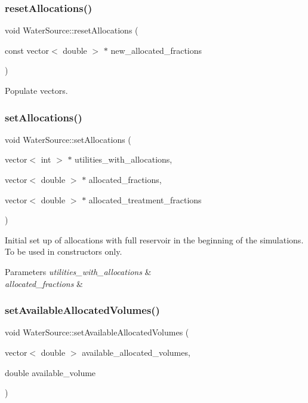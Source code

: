 \subsubsection{\texorpdfstring{reset\+Allocations()}{resetAllocations()}}
{\footnotesize\ttfamily void Water\+Source\+::reset\+Allocations (\begin{DoxyParamCaption}\item[{const vector$<$ double $>$ $\ast$}]{new\+\_\+allocated\+\_\+fractions }\end{DoxyParamCaption})}

Populate vectors. \mbox{\label{classWaterSource_ac834762e016e796968ad286feeca7be6}} 
\subsubsection{\texorpdfstring{set\+Allocations()}{setAllocations()}}
{\footnotesize\ttfamily void Water\+Source\+::set\+Allocations (\begin{DoxyParamCaption}\item[{vector$<$ int $>$ $\ast$}]{utilities\+\_\+with\+\_\+allocations,  }\item[{vector$<$ double $>$ $\ast$}]{allocated\+\_\+fractions,  }\item[{vector$<$ double $>$ $\ast$}]{allocated\+\_\+treatment\+\_\+fractions }\end{DoxyParamCaption})}

Initial set up of allocations with full reservoir in the beginning of the simulations. To be used in constructors only. 
\begin{DoxyParams}{Parameters}
{\em utilities\+\_\+with\+\_\+allocations} & \\
\hline
{\em allocated\+\_\+fractions} & \\
\hline
\end{DoxyParams}
\mbox{\label{classWaterSource_ae29ed4aa2b9c97c5a41772daf4631f05}} 
\subsubsection{\texorpdfstring{set\+Available\+Allocated\+Volumes()}{setAvailableAllocatedVolumes()}}
{\footnotesize\ttfamily void Water\+Source\+::set\+Available\+Allocated\+Volumes (\begin{DoxyParamCaption}\item[{vector$<$ double $>$}]{available\+\_\+allocated\+\_\+volumes,  }\item[{double}]{available\+\_\+volume }\end{DoxyParamCaption})}

